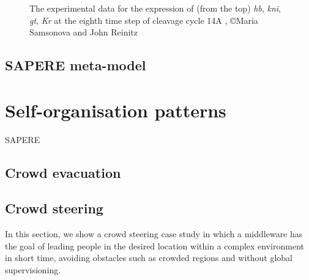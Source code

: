 \documentclass[12pt,a4paper,twoside,openright]{book}
\begin{document}
\begin{figure}
\caption{The experimental data for the expression of (from the top) \emph{hb}, \emph{kni}, \emph{gt}, \emph{Kr} at the 
eighth time step of cleavage cycle 14A  \cite{database-2008}, \copyright Maria Samsonova and John Reinitz}
\label{fig:expdata}
\end{figure}


\section{SAPERE meta-model}

\chapter{Self-organisation patterns}
SAPERE
\section{Crowd evacuation}
\section{Crowd steering}
\label{jos-museum}
In this section, we show a crowd steering case study in which a middleware has the goal of leading people in the desired location within a complex environment in short time, avoiding obstacles such as crowded regions and without global supervisioning. 
\end{document}
